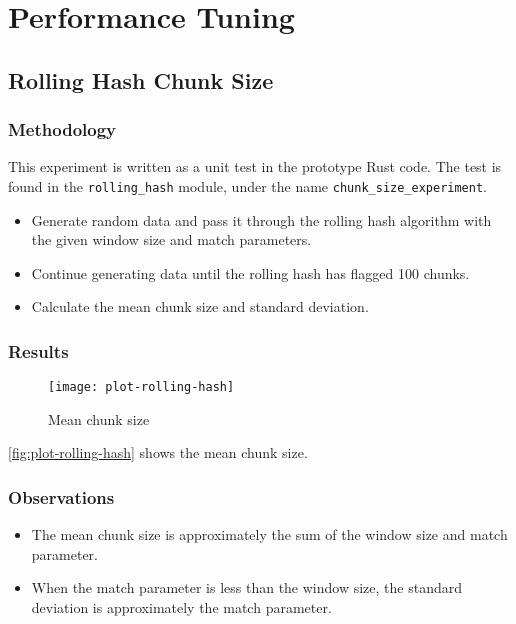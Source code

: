 \fi


\section{Performance Tuning}


\subsection{Rolling Hash Chunk Size}\label{rolling-hash-exp}

\subsubsection{Methodology}

This experiment is written as a unit test in the prototype Rust code. The test
is found in the \texttt{rolling\_hash} module, under the name
\texttt{chunk\_size\_experiment}.

\begin{itemize}

  \item Generate random data and pass it through the rolling hash algorithm with
    the given window size and match parameters.

  \item Continue generating data until the rolling hash has flagged 100 chunks.

  \item Calculate the mean chunk size and standard deviation.

\end{itemize}

\subsubsection{Results}

\begin{figure}[p]
  \caption{Mean chunk size}
  \label{fig:plot-rolling-hash}
  \centering
    \texttt{[image: plot-rolling-hash]}
\end{figure}

\autoref{fig:plot-rolling-hash} shows the mean chunk size.

\subsubsection{Observations}

\begin{itemize}

  \item The mean chunk size is approximately the sum of the window size and
    match parameter.

  \item When the match parameter is less than the window size, the standard
    deviation is approximately the match parameter.

\end{itemize}


